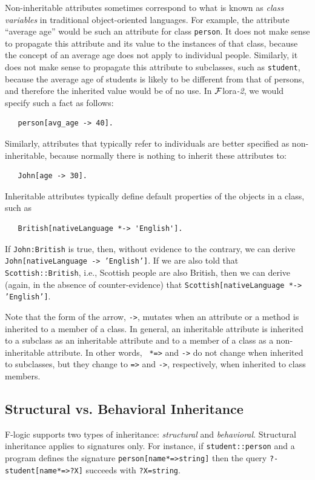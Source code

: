 \documentclass[11pt]{article}
\newcommand{\FLORA}{{\mbox{\sc ${\cal F}${lora}\rm\emph{-2}}}\xspace}
\newcommand{\fl}{\mbox{F-logic}\xspace}
\begin{document}
Non-inheritable attributes sometimes correspond to what is known as
\emph{class variables} in traditional object-oriented languages. For
example, the attribute ``average age'' would be such an attribute for class
{\tt person}. It does not make sense to propagate this attribute and its
value to the instances of that class, because the concept of an average age
does not apply to individual people. Similarly, it does not make sense to
propagate this attribute to subclasses, such as {\tt student}, because the
average age of students is likely to be different from that of persons, and
therefore the inherited value would be of no use. In \FLORA, we would
specify such a fact as follows:
\begin{verbatim}
   person[avg_age -> 40].  
\end{verbatim}
Similarly, attributes that typically refer to individuals are better
specified as non-inheritable, because normally there is nothing to inherit
these attributes to:
\begin{verbatim}
   John[age -> 30].  
\end{verbatim}
Inheritable attributes typically define default properties 
of the objects in a class, such as
\begin{verbatim}
   British[nativeLanguage *-> 'English'].  
\end{verbatim}
If {\tt John:British} is true, then, without evidence to the contrary,
we can derive {\tt
  John[nativeLanguage -> 'English']}.
If we are also told that {\tt Scottish::British}, i.e., Scottish
  people are also British, then we can derive (again, in the absence of 
  counter-evidence) that {\tt Scottish[nativeLanguage *-> 'English']}.
  
  Note that the form of the arrow, {\tt ->}, mutates when an attribute or a
  method is inherited to a member of a class. In general, an inheritable
  attribute is inherited to a subclass as an inheritable attribute and to a
  member of a class as a non-inheritable attribute. In other words, {\tt
    *=>} and {\tt *->} do not change when
  inherited to subclasses, but they change to {\tt =>}
    and {\tt ->}, respectively, when inherited to class members.

\subsection{Structural vs. Behavioral Inheritance}

\fl supports two types of inheritance: \emph{structural} and
\emph{behavioral}.  Structural inheritance applies to signatures only. For
instance, if {\tt student::person} and a program defines the signature
{\tt person[name{*=>}string]} then the query {\tt ?- student[name{*=>}?X]}
succeeds with {\tt ?X=string}.
\end{document}
